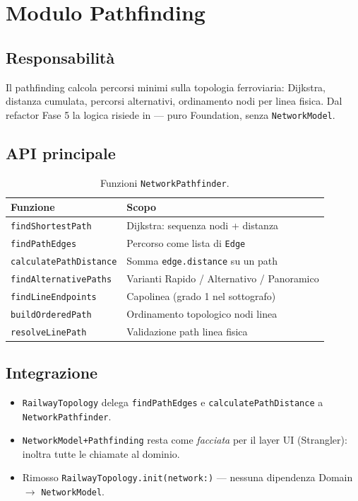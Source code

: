 \chapter{Modulo Pathfinding}
\label{ch:pathfinding}

\section{Responsabilità}

Il pathfinding calcola percorsi minimi sulla topologia ferroviaria:
Dijkstra, distanza cumulata, percorsi alternativi, ordinamento nodi per linea
fisica. Dal refactor Fase 5 la logica risiede in
 --- puro Foundation,
senza \texttt{NetworkModel}.

\section{API principale}

\begin{table}[htbp]
\centering
\caption{Funzioni \texttt{NetworkPathfinder}.}
\begin{tabularx}{\textwidth}{lX}
  \toprule
  \textbf{Funzione} & \textbf{Scopo} \\
  \midrule
  \texttt{findShortestPath} & Dijkstra: sequenza nodi + distanza \\
  \texttt{findPathEdges}    & Percorso come lista di \texttt{Edge} \\
  \texttt{calculatePathDistance} & Somma \texttt{edge.distance} su un path \\
  \texttt{findAlternativePaths}  & Varianti Rapido / Alternativo / Panoramico \\
  \texttt{findLineEndpoints}     & Capolinea (grado 1 nel sottografo) \\
  \texttt{buildOrderedPath}        & Ordinamento topologico nodi linea \\
  \texttt{resolveLinePath}         & Validazione path linea fisica \\
  \bottomrule
\end{tabularx}
\end{table}

\section{Integrazione}

\begin{itemize}
  \item \texttt{RailwayTopology} delega \texttt{findPathEdges} e
    \texttt{calculatePathDistance} a \texttt{NetworkPathfinder}.
  \item \texttt{NetworkModel+Pathfinding} resta come \emph{facciata} per il
    layer UI (Strangler): inoltra tutte le chiamate al dominio.
  \item Rimosso \texttt{RailwayTopology.init(network:)} --- nessuna
    dipendenza Domain $\rightarrow$ \texttt{NetworkModel}.
\end{itemize}

